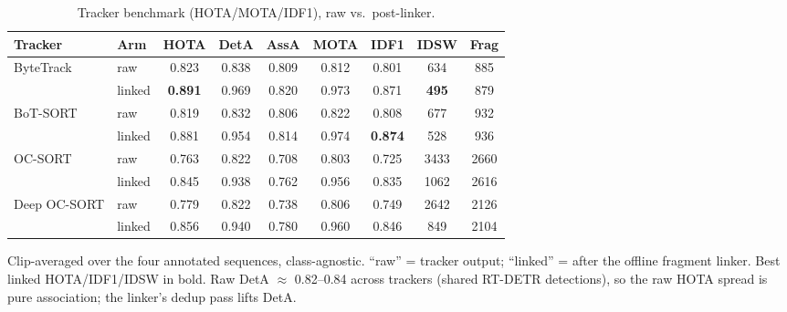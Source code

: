 \begin{table}[ht]
  \centering
  \caption{Tracker benchmark (HOTA/MOTA/IDF1), raw vs.\ post-linker.}
  \label{tab:trackers}
  \begin{tabular}{llccccccc}
    \toprule
    Tracker & Arm & HOTA & DetA & AssA & MOTA & IDF1 & IDSW & Frag \\
    \midrule
    ByteTrack & raw & 0.823 & 0.838 & 0.809 & 0.812 & 0.801 & 634 & 885 \\
     & linked & \textbf{0.891} & 0.969 & 0.820 & 0.973 & 0.871 & \textbf{495} & 879 \\
    \addlinespace
    BoT-SORT & raw & 0.819 & 0.832 & 0.806 & 0.822 & 0.808 & 677 & 932 \\
     & linked & 0.881 & 0.954 & 0.814 & 0.974 & \textbf{0.874} & 528 & 936 \\
    \addlinespace
    OC-SORT & raw & 0.763 & 0.822 & 0.708 & 0.803 & 0.725 & 3433 & 2660 \\
     & linked & 0.845 & 0.938 & 0.762 & 0.956 & 0.835 & 1062 & 2616 \\
    \addlinespace
    Deep OC-SORT & raw & 0.779 & 0.822 & 0.738 & 0.806 & 0.749 & 2642 & 2126 \\
     & linked & 0.856 & 0.940 & 0.780 & 0.960 & 0.846 & 849 & 2104 \\
    \bottomrule
  \end{tabular}
  \par\smallskip
  \footnotesize Clip-averaged over the four annotated sequences, class-agnostic. ``raw'' = tracker output; ``linked'' = after the offline fragment linker. Best linked HOTA/IDF1/IDSW in bold. Raw DetA $\approx$ 0.82--0.84 across trackers (shared RT-DETR detections), so the raw HOTA spread is pure association; the linker's dedup pass lifts DetA.
\end{table}
